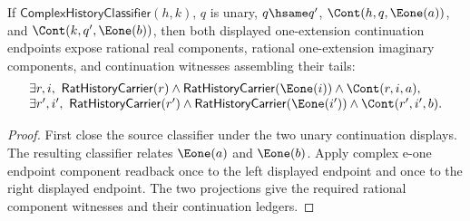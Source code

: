 \begin{theorem}
\label{thm:complex-history-classifier-unary-continuation-e1-endpoint-components}
If $\mathsf{ComplexHistoryClassifier}(h,k)$, $q$ is unary,
$q\hsame q'$, $\Cont(h,q,\Eone(a))$, and $\Cont(k,q',\Eone(b))$, then both
displayed one-extension continuation endpoints expose rational real components,
rational one-extension imaginary components, and continuation witnesses
assembling their tails:
$$
\begin{array}{l}
\exists r,i,\ \mathsf{RatHistoryCarrier}(r)\land
\mathsf{RatHistoryCarrier}(\Eone(i))\land \Cont(r,i,a),\\
\exists r',i',\ \mathsf{RatHistoryCarrier}(r')\land
\mathsf{RatHistoryCarrier}(\Eone(i'))\land \Cont(r',i',b).
\end{array}
$$
\end{theorem}
\begin{proof}
First close the source classifier under the two unary continuation displays.
The resulting classifier relates $\Eone(a)$ and $\Eone(b)$. Apply complex
e-one endpoint component readback once to the left displayed endpoint and once
to the right displayed endpoint. The two projections give the required
rational component witnesses and their continuation ledgers.
\end{proof}

